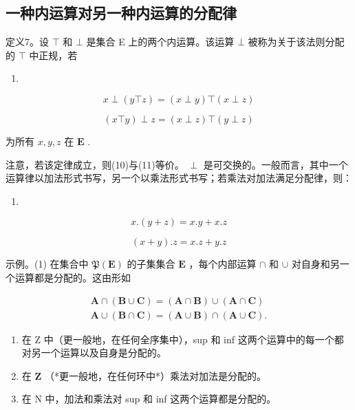 \subsection{一种内运算对另一种内运算的分配律}

定义7。设 \(\top\) 和 \(\bot\) 是集合 E 上的两个内运算。该运算 \(\bot\) 被称为关于该法则分配的 \(\top\) 中正规，若

\begin{enumerate}
\def\labelenumi{(\arabic{enumi})}
\setcounter{enumi}{9}
\tightlist
\item
\end{enumerate}

\[
x \perp (y \top z) = (x \perp y) \top (x \perp z)\tag{11}
\]

\[
(x \top y) \perp z = (x \perp z) \top (y \perp z)
\]

为所有 \(x, y, z\) 在 \(\mathbf{E}\) .

注意，若该定律成立，则(10)与(11)等价。 \(\perp\) 是可交换的。一般而言，其中一个运算律以加法形式书写，另一个以乘法形式书写；若乘法对加法满足分配律，则：

\begin{enumerate}
\def\labelenumi{(\arabic{enumi})}
\setcounter{enumi}{11}
\tightlist
\item
\end{enumerate}

\[
x. (y + z) = x. y + x. z\tag{13}
\]

\[
(x + y). z = x. z + y. z
\]

示例。(1) 在集合中 \(\mathfrak{P}(\mathbf{E})\) 的子集集合 \(\mathbf{E}\) ，每个内部运算 \(\cap\) 和 \(\cup\) 对自身和另一个运算都是分配的。这由形如

\[
\begin{array}{l} \mathbf {A} \cap (\mathbf {B} \cup \mathbf {C}) = (\mathbf {A} \cap \mathbf {B}) \cup (\mathbf {A} \cap \mathbf {C}) \\ \mathbf {A} \cup (\mathbf {B} \cap \mathbf {C}) = (\mathbf {A} \cup \mathbf {B}) \cap (\mathbf {A} \cup \mathbf {C}). \end{array}
\]

\begin{enumerate}
\def\labelenumi{(\arabic{enumi})}
\setcounter{enumi}{1}
\item
  在 Z 中（更一般地，在任何全序集中），sup 和 inf 这两个运算中的每一个都对另一个运算以及自身是分配的。
\item
  在 \(\mathbf{Z}\) （*更一般地，在任何环中*）乘法对加法是分配的。
\item
  在 N 中，加法和乘法对 sup 和 inf 这两个运算都是分配的。
\end{enumerate}

